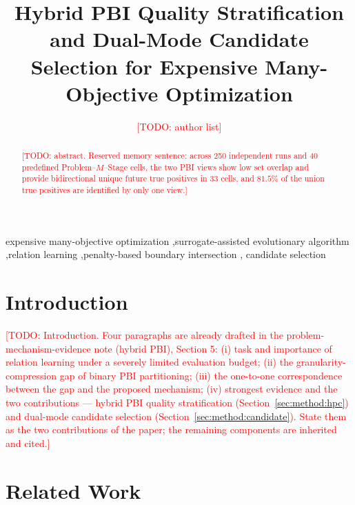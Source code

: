 \documentclass[final,5p,times,twocolumn]{elsarticle}
\newcommand{\TODO}[1]{\textcolor{red}{[TODO: #1]}}
\begin{document}
\begin{frontmatter}

\title{Hybrid PBI Quality Stratification and Dual-Mode Candidate Selection
for Expensive Many-Objective Optimization}

\author{\TODO{author list}}


\begin{abstract}
\TODO{abstract. Reserved memory sentence: across 250 independent runs and 40
predefined Problem--$M$--Stage cells, the two PBI views show low set overlap and
provide bidirectional unique future true positives in 33 cells, and $81.5\%$ of
the union true positives are identified by only one view.}
\end{abstract}

\begin{keyword}
expensive many-objective optimization \sep surrogate-assisted evolutionary
algorithm \sep relation learning \sep penalty-based boundary intersection \sep
candidate selection
\end{keyword}

\end{frontmatter}

\section{Introduction}
\label{sec:intro}

\TODO{Introduction. Four paragraphs are already drafted in the
problem-mechanism-evidence note (hybrid PBI), Section 5: (i) task and
importance of relation learning under a severely limited evaluation budget;
(ii) the granularity-compression gap of binary PBI partitioning; (iii) the
one-to-one correspondence between the gap and the proposed mechanism;
(iv) strongest evidence and the two contributions --- hybrid PBI quality
stratification (Section~\ref{sec:method:hpc}) and dual-mode candidate selection
(Section~\ref{sec:method:candidate}). State them as the two contributions of the
paper; the remaining components are inherited and cited.}

\section{Related Work}
\label{sec:related}
\end{document}

